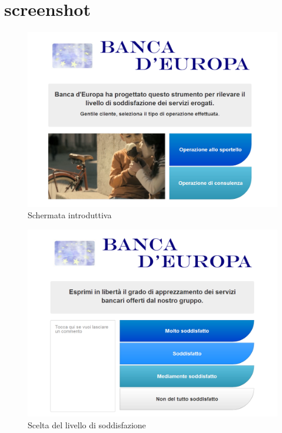 \section{screenshot}
  \begin{figure}[!h]
    \begin{center}
      \includegraphics[scale=0.30]{icons/screen_intro.png}
      \caption{Schermata introduttiva}
      \label{fig:screen_intro}
    \end{center}
  \end{figure}
  \begin{figure}[!h]
    \begin{center}
      \includegraphics[scale=0.30]{icons/screen_voting.png}
      \caption{Scelta del livello di soddisfazione}
      \label{fig:screen_voting}
    \end{center}
  \end{figure}
